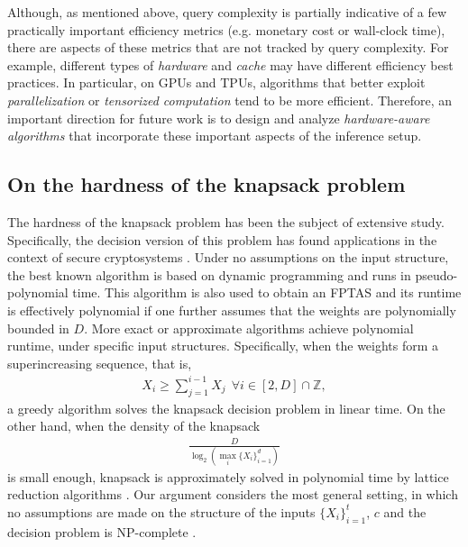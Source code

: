 Although, as mentioned above, query complexity is partially indicative of a few practically important efficiency metrics (e.g. monetary cost or wall-clock time),
there are aspects of these metrics that are not tracked by query complexity.
For example, different types of \emph{hardware} and \emph{cache} may have different efficiency best practices.
In particular, on GPUs and TPUs, algorithms that better exploit \emph{parallelization} or \emph{tensorized computation} tend to be more efficient.
Therefore, an important direction for future work is to design and analyze \emph{hardware-aware algorithms} that incorporate these important aspects of the inference setup.


\clearpage
\subsection{On the hardness of the knapsack problem}

The hardness of the knapsack problem has been the subject of extensive study. Specifically, the decision version of this problem has found applications in the context of secure cryptosystems \cite{Odlyzko1998TheRA}. Under no assumptions on the input structure, the best known algorithm is based on dynamic programming \cite{knapsackProblems} and runs in pseudo-polynomial time. This algorithm is also used to obtain an FPTAS and its runtime is effectively polynomial if one further assumes that the weights are polynomially bounded in $D$. More exact or approximate algorithms achieve polynomial runtime, under specific input structures. Specifically, when the weights form a superincreasing sequence, that is,
\begin{align*}
X_i \geq \sum_{j=1}^{i-1} X_j \ \ \forall i \in [2, D] \cap \mathbb{Z}, 
\end{align*}
a greedy algorithm solves the knapsack decision problem \cite{Odlyzko1998TheRA} in linear time. On the other hand, when the density of the knapsack
\begin{align*}
    \frac{D}{\log_2 (\max_i \{X_i\}_{i=1}^d)}
\end{align*}
 is small enough, knapsack is approximately solved in polynomial time by lattice reduction algorithms \cite{plantard2013lattice}.
 Our argument considers the most general setting, in which no assumptions are made on the structure of the inputs $\{ X_i\}_{i=1}^t$, $c$ and the decision problem is NP-complete \cite{reducibilityKarp}.
